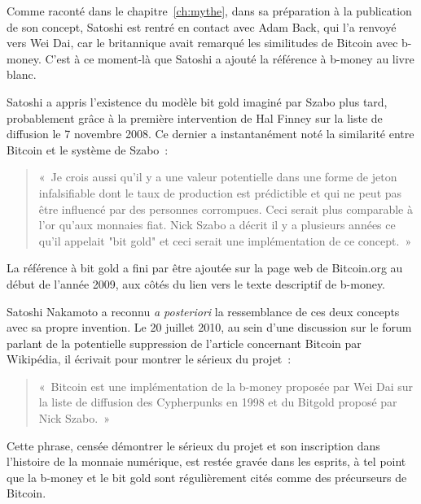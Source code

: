 Comme raconté dans le chapitre~\ref{ch:mythe}, dans sa préparation à la publication de son concept, Satoshi est rentré en contact avec Adam Back, qui l'a renvoyé vers Wei Dai, car le britannique avait remarqué les similitudes de Bitcoin avec b-money. C'est à ce moment-là que Satoshi a ajouté la référence à b-money au livre blanc.

Satoshi a appris l'existence du modèle bit gold imaginé par Szabo plus tard, probablement grâce à la première intervention de Hal Finney sur la liste de diffusion le 7 novembre 2008. Ce dernier a instantanément noté la similarité entre Bitcoin et le système de Szabo~:

\begin{quote}
«~Je crois aussi qu'il y a une valeur potentielle dans une forme de jeton infalsifiable dont le taux de production est prédictible et qui ne peut pas être influencé par des personnes corrompues. Ceci serait plus comparable à l'or qu'aux monnaies fiat. Nick Szabo a décrit il y a plusieurs années ce qu'il appelait "bit gold" et ceci serait une implémentation de ce concept.~»
\end{quote}

La référence à bit gold a fini par être ajoutée sur la page web de Bitcoin.org au début de l'année 2009, aux côtés du lien vers le texte descriptif de b-money.

Satoshi Nakamoto a reconnu \emph{a posteriori} la ressemblance de ces deux concepts avec sa propre invention. Le 20 juillet 2010, au sein d'une discussion sur le forum parlant de la potentielle suppression de l'article concernant Bitcoin par Wikipédia, il écrivait pour montrer le sérieux du projet~:

\begin{quote}
«~Bitcoin est une implémentation de la b-money proposée par Wei Dai sur la liste de diffusion des Cypherpunks en 1998 et du Bitgold proposé par Nick Szabo.~»
\end{quote}

Cette phrase, censée démontrer le sérieux du projet et son inscription dans l'histoire de la monnaie numérique, est restée gravée dans les esprits, à tel point que la b-money et le bit gold sont régulièrement cités comme des précurseurs de Bitcoin.

